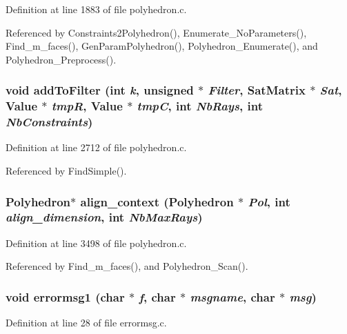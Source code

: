Definition at line 1883 of file polyhedron.c.

Referenced by Constraints2Polyhedron(), Enumerate\_\-No\-Parameters(), Find\_\-m\_\-faces(), Gen\-Param\-Polyhedron(), Polyhedron\_\-Enumerate(), and Polyhedron\_\-Preprocess().

\subsubsection{\setlength{\rightskip}{0pt plus 5cm}void add\-To\-Filter (int {\em k}, unsigned $\ast$ {\em Filter}, {\bf Sat\-Matrix} $\ast$ {\em Sat}, Value $\ast$ {\em tmp\-R}, Value $\ast$ {\em tmp\-C}, int {\em Nb\-Rays}, int {\em Nb\-Constraints})\hspace{0.3cm}{\tt  [static]}}\label{polyhedron_8c_a38}




Definition at line 2712 of file polyhedron.c.

Referenced by Find\-Simple().

\subsubsection{\setlength{\rightskip}{0pt plus 5cm}Polyhedron$\ast$ align\_\-context (Polyhedron $\ast$ {\em Pol}, int {\em align\_\-dimension}, int {\em Nb\-Max\-Rays})}\label{polyhedron_8c_a47}




Definition at line 3498 of file polyhedron.c.

Referenced by Find\_\-m\_\-faces(), and Polyhedron\_\-Scan().

\subsubsection{\setlength{\rightskip}{0pt plus 5cm}void errormsg1 (char $\ast$ {\em f}, char $\ast$ {\em msgname}, char $\ast$ {\em msg})}\label{polyhedron_8c_a6}




Definition at line 28 of file errormsg.c.


